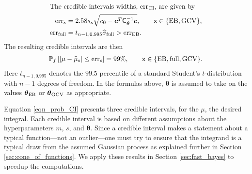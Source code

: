 \documentclass{svjour3}                     %
\newcommand{\bm}[1]{\boldsymbol{#1}}
\newcommand{\vtheta}{{\bm{\theta}}}
\newcommand{\vc}{\bm{c}}
\newcommand{\mCthetaInv}{{\mathsf{C}^{-1}_{\vtheta}}}
\newcommand{\hmu}{\widehat{\mu}}
\newcommand{\hsigma}{\widehat{\sigma}}
\newcommand{\MLE}{\textup{EB}}
\newcommand{\full}{\textup{full}}
\newcommand{\GCV}{\textup{GCV}}
\newcommand{\CI}{\textup{CI}}
\newcommand{\err}{\textup{err}}
\begin{document}
\begin{theorem}
\begin{align}
	\intertext{The credible intervals widths, $\err_{\CI}$, are given by}
	\label{eqn:err_MLEGCV}
	\err_{\mathsf{x}} & = 2.58 s_{\mathsf{x}} \sqrt{c_{0} - \vc^T\mCthetaInv\vc }, \qquad \mathsf{x} \in \{\MLE, \GCV\},  \\ 
	\err_{\textup{full}} 
	& = t_{n-1,0.995} \hsigma_{\textup{full}} > \err_\MLE. \label{FJH:eq:errFull}
	\end{align}
	The resulting credible intervals are then
	\begin{align}
	\label{eqn_prob_CI}
	\mathbb{P}_f \left[
	|\mu-\hmu_{\mathsf{x}}| \leq \err_{\mathsf{x}} \right]  = 99\%, \qquad \mathsf{x} \in \{\MLE, \full, \GCV\}.
	\end{align}
	Here $t_{n-1,0.995}$ denotes the $99.5$ percentile of a standard Student's $t$-distribution with $n-1$ degrees of freedom.  In the formulas above, $\vtheta$ is assumed to take on the values $\vtheta_{\MLE}$ or $\vtheta_{\GCV}$ as appropriate.
\end{theorem}
\fi



Equation \eqref{eqn_prob_CI} presents three credible intervals,  %
for the $\mu$, the desired integral.  Each credible interval is based on different assumptions about the hyperparameters $m$, $s$, and $\vtheta$.  
Since a credible interval makes a statement about a typical function---not an outlier---one must try to ensure that the integrand is a typical draw from the assumed Gaussian process  as explained further in Section \ref{sec:cone_of_functions}. We apply these results in Section \ref {sec:fast_bayes} to speedup the computations.
\end{document}
